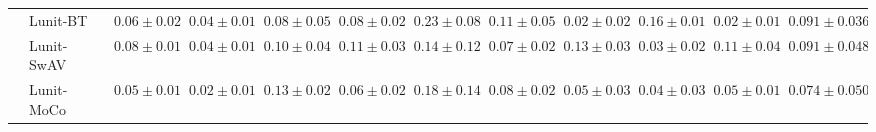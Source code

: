 \begin{tabular}{ll|cccc|c|cccc|c}
 & Lunit-BT~\cite{kang2023benchmarking} & $0.06 \pm 0.02$ & $0.04 \pm 0.01$ & $0.08 \pm 0.05$ & $0.08 \pm 0.02$ & $0.23 \pm 0.08$ & $0.11 \pm 0.05$ & $0.02 \pm 0.02$ & $0.16 \pm 0.01$ & $0.02 \pm 0.01$ & $0.091 \pm 0.036$ \\
 & Lunit-SwAV~\cite{kang2023benchmarking} & $0.08 \pm 0.01$ & $0.04 \pm 0.01$ & $0.10 \pm 0.04$ & $0.11 \pm 0.03$ & $0.14 \pm 0.12$ & $0.07 \pm 0.02$ & $0.13 \pm 0.03$ & $0.03 \pm 0.02$ & $0.11 \pm 0.04$ & $0.091 \pm 0.048$ \\
 & Lunit-MoCo~\cite{kang2023benchmarking} & $0.05 \pm 0.01$ & $0.02 \pm 0.01$ & $0.13 \pm 0.02$ & $0.06 \pm 0.02$ & $0.18 \pm 0.14$ & $0.08 \pm 0.02$ & $0.05 \pm 0.03$ & $0.04 \pm 0.03$ & $0.05 \pm 0.01$ & $0.074 \pm 0.050$ \\
\cline{1-12}
\bottomrule
\end{tabular}
